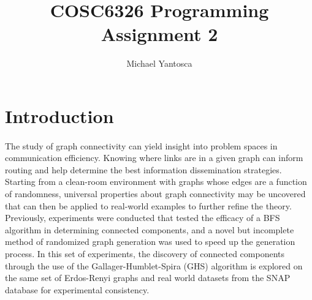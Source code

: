 \documentclass[11pt,epsf]{article}
\date{}
\title{COSC6326 Programming Assignment 2}
\author{Michael Yantosca}
\begin{document}
\maketitle
\tableofcontents

\section{Introduction}{
  \paragraph{}{
    The study of graph connectivity can yield insight into problem spaces in communication
    efficiency. Knowing where links are in a given graph can inform routing and help determine
    the best information dissemination strategies. Starting from a clean-room environment with
    graphs whose edges are a function of randomness, universal properties about
    graph connectivity may be uncovered that can then be applied to real-world examples
    to further refine the theory. Previously, experiments were conducted that tested the efficacy
    of a BFS algorithm in determining connected components, and a novel but incomplete method
    of randomized graph generation was used to speed up the generation process. In this set of experiments,
    the discovery of connected components through the use of the Gallager-Humblet-Spira (GHS) algorithm
    is explored on the same set of Erdos-Renyi graphs\autocite[5]{pa2spec} and real world datasets from the
    SNAP database\autocite{SNAP} for experimental consistency.
  }
}
\end{document}
